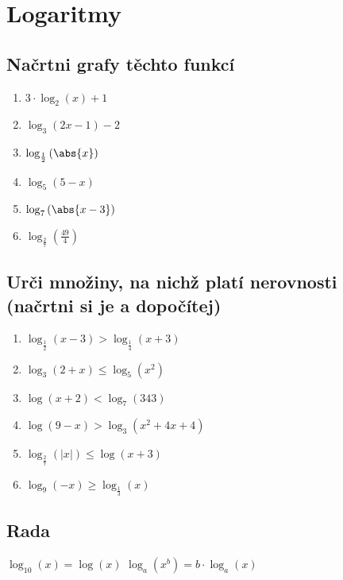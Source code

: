 \chapter{Logaritmy}
\section{Načrtni grafy těchto funkcí}
\begin{enumerate}
  \item $3 \cdot \log_{2}\left( x\right)+1$
  \item $\log_{3}\left(2x-1\right)-2$
  \item $\log_{\frac{1}{2}}\left(\abs{x} \right)$
  \item $\log_{5}\left( 5-x\right)$
  \item $\log_{7}\left( \abs{x-3} \right)$
  \item $\log_{\frac{2}{7}}\left( \frac{49}{4} \right)$
\end{enumerate}
\section{Urči množiny, na nichž platí nerovnosti (načrtni si je a dopočítej)}
\begin{enumerate}
  \item $\log_{\frac{1}{2}}\left( x-3\right) >\log_{\frac{1}{4}}\left( x+3 \right)$
  \item $\log_{3}\left( 2+x\right) \leq \log_{5}\left( x^2 \right)$
  \item $\log \left( x+2\right) < \log_{7}\left( 343 \right)$
  \item $\log \left( 9-x\right) > \log_{3}\left( x^2+4x+4 \right)$
  \item $\log_{\frac{2}{7}}\left( |x|\right) \leq \log \left( x+3 \right)$
  \item $\log_{9}\left( -x\right)  \geq \log_{\frac{1}{3}}\left( x\right)$
\end{enumerate}
\section{Rada}
  $\log_{10}\left( x\right)=\log \left(x \right)$
  $\log_a\left( x^b\right)=b\cdot \log_a\left( x\right) $

